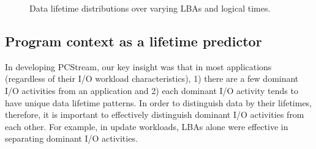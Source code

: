 \begin{figure}[t]
	\centering
	\vspace{-15pt}
	\caption{
		Data lifetime distributions over varying LBAs and logical times.}
		\label{fig:lba_lifetime}
	\vspace{-15pt}
\end{figure}

\vspace{-5pt}
\subsection{Program context as a lifetime predictor}
In developing {\sf PCStream}, our key insight was that in most applications 
(regardless of their I/O workload characteristics), 
1) there are a few dominant I/O activities from an application 
and 2) each dominant I/O activity tends to have unique data lifetime patterns.   
In order to distinguish data by their lifetimes, therefore, 
it is important to effectively distinguish dominant I/O activities from each other.  
For example, in update workloads, 
LBAs alone were effective in separating dominant I/O activities.  

